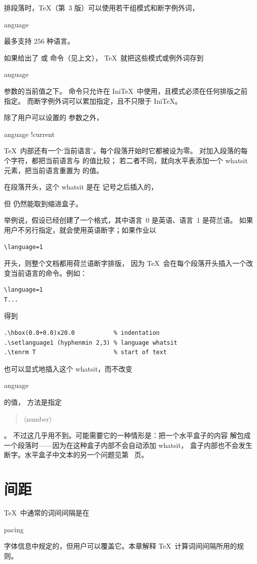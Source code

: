 \documentclass[a4paper]{rapport3}
\makeatletter
\def\gr#1{$\langle$#1$\rangle$}\def\key#1{{\tt#1}}
\def\alt{}\def\altt{}%
\def\IniTeX{Ini\TeX}\def\LamsTeX{LAMS\TeX}\def\VirTeX{Vir\TeX}
\newenvironment{disp}{\begin{quotation}}{\end{quotation}}
\def\term#1\par{\index{#1}}
\def\cstoidx#1\par{\index{#1@\cs{#1}}}
\def\csidx#1{\cstoidx #1\par\cs{#1}}
\makeatother
\begin{document}
排段落时，\TeX（第~3 版）可以使用若干组模式和断字例外词，
\alt
\term language\par
最多支持 256 种语言。 

如果给出了  或  命令（见上文），
\TeX\ 就把这些模式或例外词存到 \csidx{language} 参数的当前值之下。
 命令只允许在 \IniTeX\ 中使用，且模式必须在任何排版之前指定。
而断字例外词可以累加指定，且不只限于 \IniTeX。

除了用户可以设置的  参数之外，
\term language !current\par
\TeX\ 内部还有一个`当前语言'。每个段落开始时它都被设为零。
对加入段落的每个字符，都把当前语言与  的值比较；
若二者不同，就向水平表添加一个 whatsit 元素，把当前语言重置为
 的值。

在段落开头，这个 whatsit 是在  记号之后插入的，
\altt
但  仍然能取到缩进盒子。

举例说，假设已经创建了一个格式，其中语言~0 是英语、语言~1 是荷兰语。
如果用户不另行指定，就会使用英语断字；如果作业以
\begin{verbatim}
\language=1
\end{verbatim}
开头，则整个文档都用荷兰语断字排版，
因为 \TeX\ 会在每个段落开头插入一个改变当前语言的命令。例如：
\begin{verbatim}
\language=1
T...
\end{verbatim}
得到
\begin{verbatim}
.\hbox(0.0+0.0)x20.0           % indentation
.\setlanguage1 (hyphenmin 2,3) % language whatsit
.\tenrm T                      % start of text
\end{verbatim}

也可以显式地插入这个 whatsit，而不改变 \csidx{language} 的值，
方法是指定 \begin{disp}\gr{number}\end{disp}。
不过这几乎用不到。可能需要它的一种情形是：把一个水平盒子的内容
解包成一个段落时——因为在这种盒子内部不会自动添加 whatsit，
盒子内部也不会发生断字。水平盒子中文本的另一个问题见第~\pageref{wide:vbox} 页。


\endofchapter
\chapter{间距}\label{space}

\TeX\ 中通常的词间间隔是在
\term spacing\par
字体信息中规定的，但用户可以覆盖它。本章解释 \TeX\ 计算词间间隔所用的规则。
\end{document}
